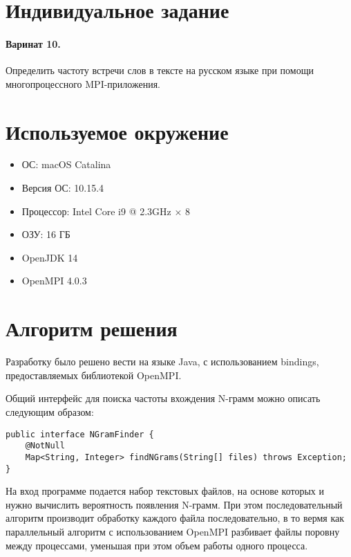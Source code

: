 





\tableofcontents
\newpage

\section{Индивидуальное задание}

\paragraph{Варинат 10.} Определить частоту встречи слов в тексте на русском языке при помощи многопроцессного MPI-приложения. 

\section{Используемое окружение}

\begin{itemize}
	\item ОС: macOS Catalina
	\item Версия ОС: 10.15.4
	\item Процессор: Intel Core i9 @ 2.3GHz × 8
	\item ОЗУ: 16 ГБ
	\item OpenJDK 14
	\item OpenMPI 4.0.3 
\end{itemize}

\section{Алгоритм решения}

Разработку было решено вести на языке Java, с использованием bindings, предоставляемых библиотекой OpenMPI.

Общий интерфейс для поиска частоты вхождения N-грамм можно описать следующим образом:

\begin{lstlisting}
public interface NGramFinder {
	@NotNull
	Map<String, Integer> findNGrams(String[] files) throws Exception;
}
\end{lstlisting}

На вход программе подается набор текстовых файлов, на основе которых и нужно вычислить вероятность появления N-грамм. При этом последовательный алгоритм производит обработку каждого файла последовательно, в то вермя как параллельный алгоритм с использованием OpenMPI разбивает файлы поровну между процессами, уменьшая при этом объем работы одного процесса.

